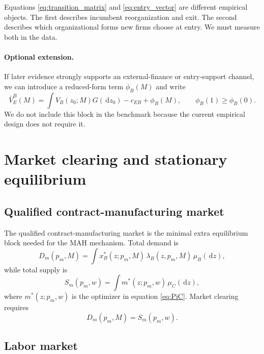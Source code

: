 \documentclass[12pt]{article}
\newcommand{\1}{\mathbf{1}}
\newcommand{\dd}{\,\mathrm{d}}
\begin{document}
Equations \eqref{eq:transition_matrix} and \eqref{eq:entry_vector} are different empirical objects. The first describes incumbent reorganization and exit. The second describes which organizational forms new firms choose at entry. We must measure both in the data.

\paragraph{Optional extension.}
If later evidence strongly supports an external-finance or entry-support channel, we can introduce a reduced-form term $\phi_B(M)$ and write
\begin{equation}
\bar V_E^B(M)=\int V_B(z_0;M)G(\dd z_0)-c_{EB}+\phi_B(M),
\qquad
\phi_B(1)\ge \phi_B(0).
\end{equation}
We do not include this block in the benchmark because the current empirical design does not require it.

\section{Market clearing and stationary equilibrium}

\subsection{Qualified contract-manufacturing market}

The qualified contract-manufacturing market is the minimal extra equilibrium block needed for the MAH mechanism. Total demand is
\begin{equation}
D_m(p_m,M)=\int x_B^*(z;p_m,M)\,\lambda_B(z,p_m,M)\,\mu_B(\dd z),
\label{eq:Dm}
\end{equation}
while total supply is
\begin{equation}
S_m(p_m,w)=\int m^*(z;p_m,w)\,\mu_C(\dd z),
\label{eq:Sm}
\end{equation}
where $m^*(z;p_m,w)$ is the optimizer in equation \eqref{eq:PiC}. Market clearing requires
\begin{equation}
D_m(p_m,M)=S_m(p_m,w).
\label{eq:pm_clear}
\end{equation}

\subsection{Labor market}
\end{document}
